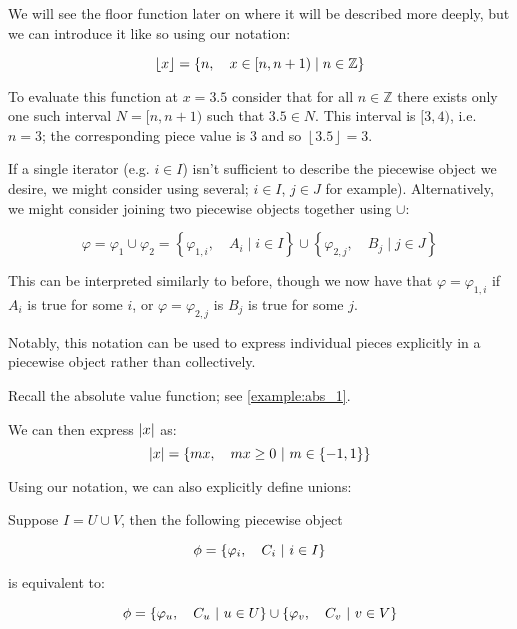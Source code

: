 \begin{example}
    We will see the floor function later on where it will be described more deeply, but we can introduce it like so using our notation:

    $$
        \lfloor x\rfloor=\left\{n,\quad x\in[n,n+1)\mid n\in\mathbb{Z}\right\}
    $$

    To evaluate this function at $x=3.5$ consider that for all $n\in\mathbb{Z}$ there exists only one such interval $N=[n,n+1)$ such that $3.5\in N$. This interval is $[3,4)$, i.e. $n=3$; the corresponding piece value is $3$ and so $\left\lfloor 3.5\right\rfloor=3$.
\end{example}

If a single iterator (e.g. $i\in I$) isn't sufficient to describe the piecewise object we desire, we might consider using several; $i\in I$, $j\in J$ for example). Alternatively, we might consider joining two piecewise objects together using $\cup$:

$$
    \varphi = \varphi_1 \cup \varphi_2 = \left\{\varphi_{1,i},\quad A_i\mid i\in I\right\}\cup\left\{\varphi_{2,j},\quad B_j\mid j\in J\right\}
$$

This can be interpreted similarly to before, though we now have that $\varphi=\varphi_{1,i}$ if $A_i$ is true for some $i$, or $\varphi=\varphi_{2,j}$ is $B_j$ is true for some $j$.

Notably, this notation can be used to express individual pieces explicitly in a piecewise object rather than collectively.

\begin{example}
    \label{example:abs_2}

    Recall the absolute value function; see \autoref{example:abs_1}.

    We can then express $\abs{x}$ as:
    $$
        \abs{x} = \left\{mx,\quad mx\geq 0\ \middle|\ m\in\{-1,1\}\right\}
    $$
\end{example}

\begin{theorem}
    Using our notation, we can also explicitly define unions:

    Suppose $I=U\cup V$, then the following piecewise object

    $$
        \phi=\left\{\varphi_i,\quad C_i\ \middle|\ i\in I\right\}
    $$

    is equivalent to:

    $$
        \phi=\left\{\varphi_u,\quad C_u\ \middle|\ u\in U\right\}\cup\left\{\varphi_v,\quad C_v\ \middle|\ v\in V\right\}
    $$
\end{theorem}

\newpage